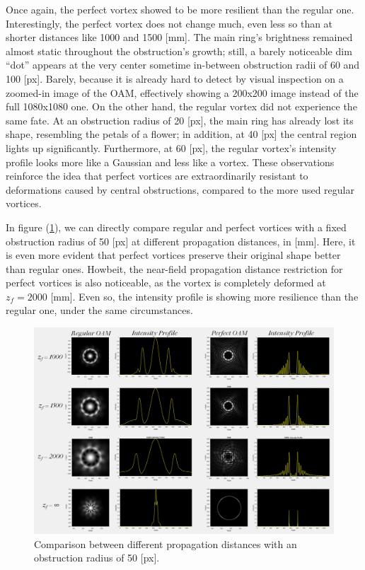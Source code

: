 Once again, the perfect vortex showed to be more resilient than the regular one. Interestingly, the perfect vortex does not change much, even less so than at shorter distances like 1000 and 1500 [mm]. The main ring's brightness remained almost static throughout the obstruction's growth; still, a barely noticeable dim ``dot'' appears at the very center sometime in-between obstruction radii of 60 and 100 [px]. Barely, because it is already hard to detect by visual inspection on a zoomed-in image of the OAM, effectively showing a 200x200 image instead of the full 1080x1080 one. On the other hand, the regular vortex did not experience the same fate. At an obstruction radius of 20 [px], the main ring has already lost its shape, resembling the petals of a flower; in addition, at 40 [px] the central region lights up significantly. Furthermore, at 60 [px], the regular vortex's intensity profile looks more like a Gaussian and less like a vortex. These observations reinforce the idea that perfect vortices are extraordinarily resistant to deformations caused by central obstructions, compared to the more used regular vortices.

In figure (\ref{fig:r=50_comparison}), we can directly compare regular and perfect vortices with a fixed obstruction radius of 50 [px] at different propagation distances, in [mm]. Here, it is even more evident that perfect vortices preserve their original shape better than regular ones. Howbeit, the near-field propagation distance restriction for perfect vortices is also noticeable, as the vortex is completely deformed at $z_f = 2000$ [mm]. Even so, the intensity profile is showing more resilience than the regular one, under the same circumstances. 

\begin{figure}[htbp]
    \centering
    \includegraphics[width=\textwidth]{images/c04/r=50_distance_comparison.png}
    \caption{Comparison between different propagation distances with an obstruction radius of 50 [px].}
    \label{fig:r=50_comparison}
\end{figure}

